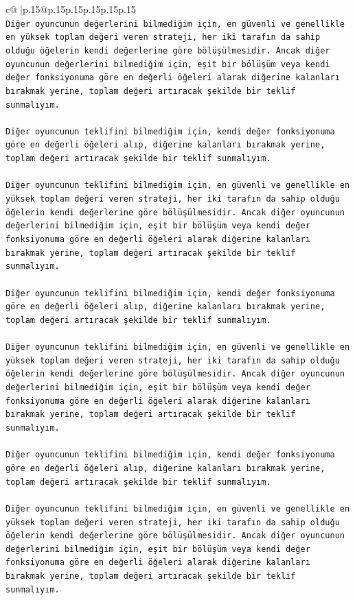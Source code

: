 \documentclass{article}
\begin{document}
{\begin{supertabular}{c@{$\;$}|p{.15\linewidth}@{}p{.15\linewidth}p{.15\linewidth}p{.15\linewidth}p{.15\linewidth}p{.15\linewidth}}
{{{\\ 
\texttt{Diğer oyuncunun değerlerini bilmediğim için, en güvenli ve genellikle en yüksek toplam değeri veren strateji, her iki tarafın da sahip olduğu öğelerin kendi değerlerine göre bölüşülmesidir. Ancak diğer oyuncunun değerlerini bilmediğim için, eşit bir bölüşüm veya kendi değer fonksiyonuma göre en değerli öğeleri alarak diğerine kalanları bırakmak yerine, toplam değeri artıracak şekilde bir teklif sunmalıyım.} \\
\\ 
\texttt{Diğer oyuncunun teklifini bilmediğim için, kendi değer fonksiyonuma göre en değerli öğeleri alıp, diğerine kalanları bırakmak yerine, toplam değeri artıracak şekilde bir teklif sunmalıyım.} \\
\\ 
\texttt{Diğer oyuncunun teklifini bilmediğim için, en güvenli ve genellikle en yüksek toplam değeri veren strateji, her iki tarafın da sahip olduğu öğelerin kendi değerlerine göre bölüşülmesidir. Ancak diğer oyuncunun değerlerini bilmediğim için, eşit bir bölüşüm veya kendi değer fonksiyonuma göre en değerli öğeleri alarak diğerine kalanları bırakmak yerine, toplam değeri artıracak şekilde bir teklif sunmalıyım.} \\
\\ 
\texttt{Diğer oyuncunun teklifini bilmediğim için, kendi değer fonksiyonuma göre en değerli öğeleri alıp, diğerine kalanları bırakmak yerine, toplam değeri artıracak şekilde bir teklif sunmalıyım.} \\
\\ 
\texttt{Diğer oyuncunun teklifini bilmediğim için, en güvenli ve genellikle en yüksek toplam değeri veren strateji, her iki tarafın da sahip olduğu öğelerin kendi değerlerine göre bölüşülmesidir. Ancak diğer oyuncunun değerlerini bilmediğim için, eşit bir bölüşüm veya kendi değer fonksiyonuma göre en değerli öğeleri alarak diğerine kalanları bırakmak yerine, toplam değeri artıracak şekilde bir teklif sunmalıyım.} \\
\\ 
\texttt{Diğer oyuncunun teklifini bilmediğim için, kendi değer fonksiyonuma göre en değerli öğeleri alıp, diğerine kalanları bırakmak yerine, toplam değeri artıracak şekilde bir teklif sunmalıyım.} \\
\\ 
\texttt{Diğer oyuncunun teklifini bilmediğim için, en güvenli ve genellikle en yüksek toplam değeri veren strateji, her iki tarafın da sahip olduğu öğelerin kendi değerlerine göre bölüşülmesidir. Ancak diğer oyuncunun değerlerini bilmediğim için, eşit bir bölüşüm veya kendi değer fonksiyonuma göre en değerli öğeleri alarak diğerine kalanları bırakmak yerine, toplam değeri artıracak şekilde bir teklif sunmalıyım.} \\
}}}
\end{supertabular}}
\end{document}
